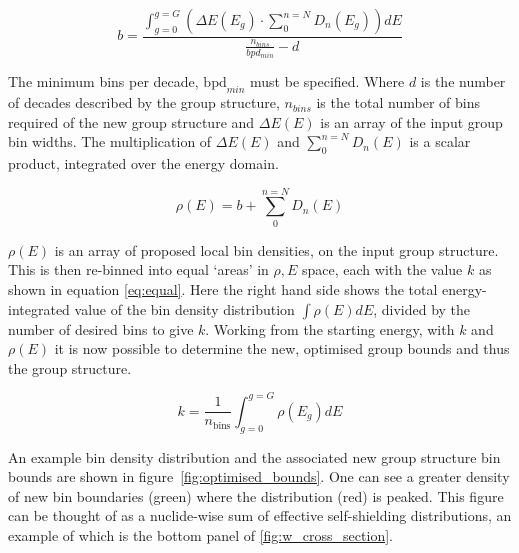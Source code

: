 \begin{equation}
  \label{eq:b}
  b = \frac{\int_{g=0}^{g=G} ( \Delta E(E_{g}) \cdot \sum_{0}^{n=N}D_{n}(E_{g}) ) dE}{\frac{n_{bins}}{bpd_{min}} - d}
\end{equation}

The minimum bins per decade, $\mathrm{bpd}_{min}$ must be specified. Where $d$ is the number of decades described by the group structure, $n_{bins}$ is the total number of bins required of the new group structure and $\Delta E(E)$ is an array of the input group bin widths. The multiplication of $\Delta E(E)$ and $\sum_{0}^{n=N}D_{n}(E)$ is a scalar product, integrated over the energy domain.

\begin{equation}
  \label{eq:offset}
  \rho(E) = b + \sum_{0}^{n=N}D_{n}(E)
\end{equation}

$\rho(E)$ is an array of proposed local bin densities, on the input group structure. This is then re-binned into equal `areas' in $\rho, E$ space, each with the value $k$ as shown in equation \ref{eq:equal}. Here the right hand side shows the total energy-integrated value of the bin density distribution $\int \rho(E) dE$, divided by the number of desired bins to give $k$. Working from the starting energy, with $k$ and $\rho(E)$ it is now possible to determine the new, optimised group bounds and thus the group structure.

\begin{equation}
  \label{eq:equal}
  k = \frac{1}{n_\mathrm{bins}}\int_{g=0}^{g=G}\rho(E_{g})dE 
\end{equation} 

An example bin density distribution and the associated new group structure bin bounds are shown in figure~\ref{fig:optimised_bounds}. One can see a greater density of new bin boundaries (green) where the distribution (red) is peaked. This figure can be thought of as a nuclide-wise sum of effective self-shielding distributions, an example of which is the bottom panel of \ref{fig:w_cross_section}.


